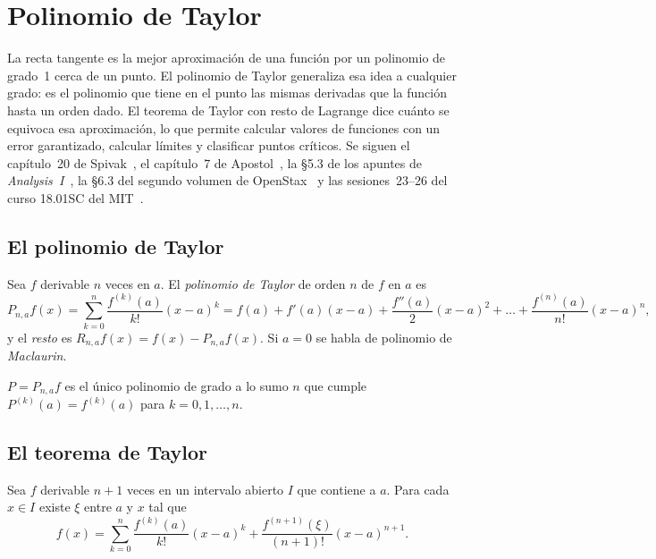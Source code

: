 \chapter{Polinomio de Taylor}
\label{tema:6}

La recta tangente es la mejor aproximación de una función por un polinomio de grado~1 cerca de un punto. El polinomio de Taylor generaliza esa idea a cualquier grado: es el polinomio que tiene en el punto las mismas derivadas que la función hasta un orden dado. El teorema de Taylor con resto de Lagrange dice cuánto se equivoca esa aproximación, lo que permite calcular valores de funciones con un error garantizado, calcular límites y clasificar puntos críticos. Se siguen el capítulo~20 de Spivak~\cite{spivak}, el capítulo~7 de Apostol~\cite{apostol}, la §5.3 de los apuntes de \emph{Analysis~I}~\cite{cambA1}, la §6.3 del segundo volumen de OpenStax~\cite{osc2} y las sesiones~23--26 del curso 18.01SC del MIT~\cite{mit1801}.

\section{El polinomio de Taylor}

\begin{definicion}\label{def:taylor}
Sea $f$ derivable $n$ veces en $a$. El \emph{polinomio de Taylor} de orden $n$ de $f$ en $a$ es
\[
P_{n,a}f(x)=\sum_{k=0}^{n}\frac{f^{(k)}(a)}{k!}(x-a)^{k}=f(a)+f'(a)(x-a)+\frac{f''(a)}{2}(x-a)^{2}+\dots+\frac{f^{(n)}(a)}{n!}(x-a)^{n},
\]
y el \emph{resto} es $R_{n,a}f(x)=f(x)-P_{n,a}f(x)$. Si $a=0$ se habla de polinomio de \emph{Maclaurin}.
\end{definicion}

\begin{proposicion}[Caracterización]\label{prop:taylor-unico}
$P=P_{n,a}f$ es el único polinomio de grado a lo sumo $n$ que cumple $P^{(k)}(a)=f^{(k)}(a)$ para $k=0,1,\dots,n$.
\end{proposicion}

\addtocounter{definicion}{1}%

\section{El teorema de Taylor}

\begin{teorema}\label{teo:taylor}
Sea $f$ derivable $n+1$ veces en un intervalo abierto $I$ que contiene a $a$. Para cada $x\in I$ existe $\xi$ entre $a$ y $x$ tal que
\[
f(x)=\sum_{k=0}^{n}\frac{f^{(k)}(a)}{k!}(x-a)^{k}+\frac{f^{(n+1)}(\xi)}{(n+1)!}(x-a)^{n+1}.
\]
\end{teorema}

